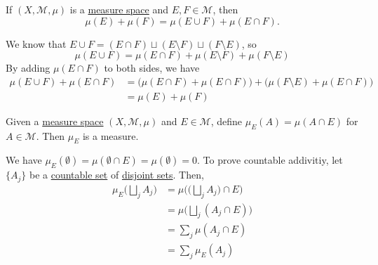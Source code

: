 	\begin{exercise}[Folland 1.9]
		If $(X, \mathcal{M}, \mu)$ is a \hyperref[def:measure-space]{measure space} and $E, F \in \mathcal{M}$, then 
		\begin{equation}
			\mu(E) + \mu(F) = \mu(E \cup F) + \mu(E \cap F).
		\end{equation}
	\end{exercise}
	\begin{solution}
		We know that $E \cup F = (E \cap F) \sqcup (E \setminus F) \sqcup (F \setminus E)$, so 
		\begin{equation}
		  \mu(E \cup F) = \mu(E \cap F) + \mu(E \setminus F) + \mu(F \setminus E)
		\end{equation}
		By adding $\mu(E \cap F)$ to both sides, we have 
		\begin{align}
			\mu(E \cup F) + \mu(E \cap F) & = \big( \mu(E \cap F) + \mu(E \cap F) \big) + \big( \mu(F \setminus E) + \mu(E \cap F) \big) \\ 
																		& = \mu(E) + \mu(F)
		\end{align}
	\end{solution}

	\begin{exercise}[Folland 1.10]
		Given a \hyperref[def:measure-space]{measure space} $(X, \mathcal{M}, \mu)$ and $E \in \mathcal{M}$, define $\mu_E(A) = \mu(A \cap E)$ for $A \in \mathcal{M}$. Then $\mu_E$ is a measure.
	\end{exercise}
	\begin{solution}
		We have $\mu_E (\emptyset) = \mu(\emptyset \cap E) = \mu(\emptyset) = 0$. To prove countable addivitiy, let $\{A_j\}$ be a \hyperref[st-def:countable]{countable set} of \hyperref[st-def:disjoint-sets]{disjoint sets}. Then, 
		\begin{align}
			\mu_E \bigg( \bigsqcup_j A_j \bigg) & = \mu \bigg( \Big( \bigsqcup_{j} A_j \Big) \cap E \bigg) \\ 
																					& = \mu \bigg( \bigsqcup_j (A_j \cap E) \bigg) \\ 
																					& = \sum_j \mu(A_j \cap E) \\ 
																					& = \sum_j \mu_E (A_j)
		\end{align}
	\end{solution}


